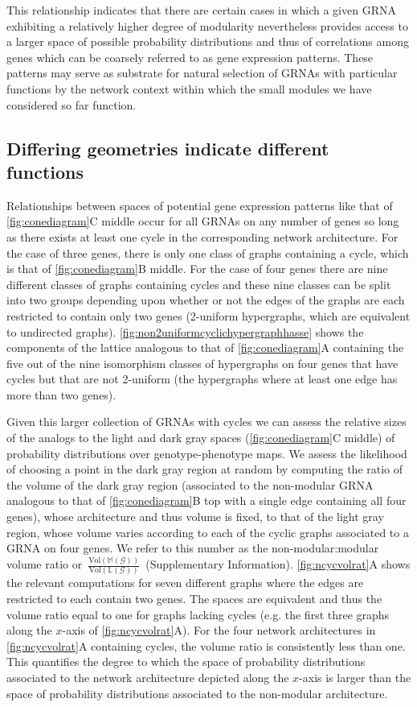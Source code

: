 This relationship indicates that there are certain cases in which a given GRNA exhibiting a relatively higher degree of modularity nevertheless provides access to a larger space of possible probability distributions and thus of correlations among genes which can be coarsely referred to as gene expression patterns. These patterns may serve as substrate for natural selection of GRNAs with particular functions by the network context within which the small modules we have considered so far function.

\subsection{Differing geometries indicate different functions}
Relationships between spaces of potential gene expression patterns like that of \ref{fig:conediagram}C middle occur for all GRNAs on any number of genes so long as there exists at least one cycle in the corresponding network architecture. For the case of three genes, there is only one class of graphs containing a cycle, which is that of \ref{fig:conediagram}B middle. For the case of four genes there are nine different classes of graphs containing cycles and these nine classes can be split into two groups depending upon whether or not the edges of the graphs are each restricted to contain only two genes (2-uniform hypergraphs, which are equivalent to undirected graphs). \ref{fig:non2uniformcyclichypergraphhasse} shows the components of the lattice analogous to that of \ref{fig:conediagram}A containing the five out of the nine isomorphism classes of hypergraphs on four genes that have cycles but that are not 2-uniform (the hypergraphs where at least one edge has more than two genes).

Given this larger collection of GRNAs with cycles we can assess the relative sizes of the analogs to the light and dark gray spaces (\ref{fig:conediagram}C middle) of probability distributions over genotype-phenotype maps. We assess the likelihood of choosing a point in the dark gray region at random by computing the ratio of the volume of the dark gray region (associated to the non-modular GRNA analogous to that of \ref{fig:conediagram}B top with a single edge containing all four genes), whose architecture and thus volume is fixed, to that of the light gray region, whose volume varies according to each of the cyclic graphs associated to a GRNA on four genes. We refer to this number as the non-modular:modular volume ratio or~$\frac{\text{Vol}(\mathbb{M}(\mathcal{G}))}{\text{Vol}(\mathbb{L}(\mathcal{G}))}$~(Supplementary Information). \ref{fig:ncycvolrat}A shows the relevant computations for seven different graphs where the edges are restricted to each contain two genes. The spaces are equivalent and thus the volume ratio equal to one for graphs lacking cycles (e.g. the first three graphs along the $x$-axis of \ref{fig:ncycvolrat}A). For the four network architectures in \ref{fig:ncycvolrat}A containing cycles, the volume ratio is consistently less than one. This quantifies the degree to which the space of probability distributions associated to the network architecture depicted along the $x$-axis is larger than the space of probability distributions associated to the non-modular architecture.

